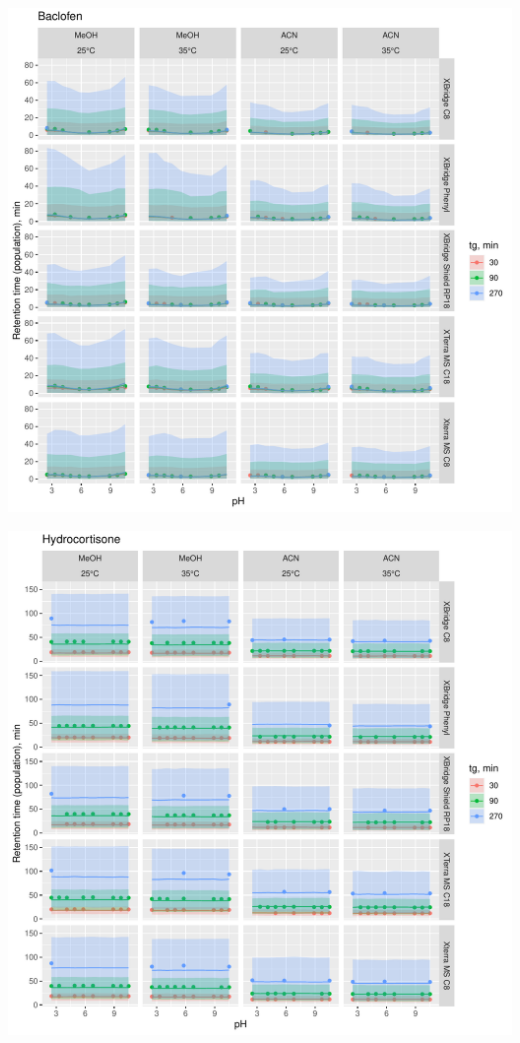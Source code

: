 \documentclass[
]{article}
\begin{document}
\newpage{}

\includegraphics{../figures/concordanceplots/Baclofen.population.pdf}

\newpage{}

\includegraphics{../figures/concordanceplots/Hydrocortisone.population.pdf}
\end{document}
